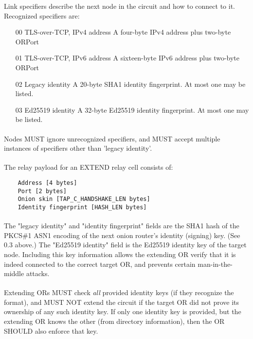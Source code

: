 Link specifiers describe the next node in the circuit and how to
connect to it. Recognized specifiers are:
\begin{itemize}
    \item [00] TLS-over-TCP, IPv4 address
    A four-byte IPv4 address plus two-byte ORPort
    \item [01] TLS-over-TCP, IPv6 address
    A sixteen-byte IPv6 address plus two-byte ORPort
    \item [02] Legacy identity
    A 20-byte SHA1 identity fingerprint. At most one may be listed.
    \item [03] Ed25519 identity
    A 32-byte Ed25519 identity fingerprint. At most one may
    be listed.
\end{itemize}

\paragraph{}
Nodes MUST ignore unrecognized specifiers, and MUST accept multiple
instances of specifiers other than 'legacy identity'.

\paragraph{}
The relay payload for an EXTEND relay cell consists of:
\begin{verbatim}
    Address [4 bytes]
    Port [2 bytes]
    Onion skin [TAP_C_HANDSHAKE_LEN bytes]
    Identity fingerprint [HASH_LEN bytes]
\end{verbatim}

\paragraph{}
The "legacy identity" and "identity fingerprint" fields are the
SHA1 hash of the PKCS\#1 ASN1 encoding of the next onion router's
identity (signing) key. (See 0.3 above.) The "Ed25519 identity"
field is the Ed25519 identity key of the target node. Including
this key information allows the extending OR verify that it is
indeed connected to the correct target OR, and prevents certain
man-in-the-middle attacks.

\paragraph{}
Extending ORs MUST check \textit{all} provided identity keys (if they
recognize the format), and MUST NOT extend the circuit if the
target OR did not prove its ownership of any such identity key.
If only one identity key is provided, but the extending OR knows
the other (from directory information), then the OR SHOULD also
enforce that key.

